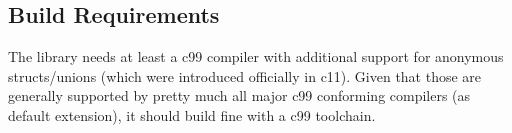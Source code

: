 \subsection{Build Requirements}

The library needs at least a c99 compiler with additional support for anonymous
structs/unions (which were introduced officially in c11). Given that those are
generally supported by pretty much all major c99 conforming compilers (as
default extension), it should build fine with a c99 toolchain.

